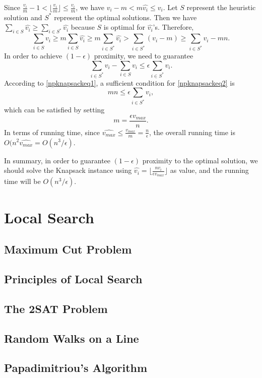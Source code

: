 Since $\frac{v_i}{m}-1<\lfloor\frac{v_i}{m}\rfloor\leq \frac{v_i}{m}$, we have $v_i-m<m\hat{v_i}\leq v_i$. Let $S$ represent the heuristic solution and $S^*$ represent the optimal solutions. Then we have $\sum_{i\in S}\hat{v_i}\geq \sum_{i\in S^*}\hat{v_i}$ because $S$ is optimal for $\hat{v_i}$'s. Therefore,
\begin{equation}\label{npknapsackeq1}
\sum_{i\in S}v_i\geq m\sum_{i\in S}\hat{v_i}\geq m\sum_{i\in S^*}\hat{v_i}> \sum_{i\in S^*}(v_i-m)\geq \sum_{i\in S^*}v_i-mn.
\end{equation}
In order to achieve $(1-\epsilon)$ proximity, we need to guarantee 
\begin{equation}\label{npknapsackeq2}
\sum_{i\in S^*}v_i-\sum_{i\in S}v_i\leq\epsilon\sum_{i\in S^*}v_i.
\end{equation}
According to \eqref{npknapsackeq1}, a sufficient condition for \eqref{npknapsackeq2} is  
\begin{equation*}
mn\leq \epsilon\sum_{i\in S^*}v_i,
\end{equation*}
which can be satisfied by setting
\begin{equation*}
m=\frac{\epsilon v_{max}}{n}.
\end{equation*}
In terms of running time, since $\hat{v_{max}}\leq\frac{v_{max}}{m}=\frac{n}{\epsilon}$, the overall running time is $O(n^2\hat{v_{max}}=O(n^3/\epsilon)$.

In summary, in order to guarantee $(1-\epsilon)$ proximity to the optimal solution, we should solve the Knapsack instance using $\hat{v_i}=\lfloor\frac{nv_i}{\epsilon v_{max}}\rfloor$ as value, and the running time will be $O(n^3/\epsilon)$.
\section{Local Search}
\subsection{Maximum Cut Problem}
\subsection{Principles of Local Search}
\subsection{The 2SAT Problem}
\subsection{Random Walks on a Line}
\subsection{Papadimitriou's Algorithm}
\ifx\PREAMBLE\undefined

\fi
